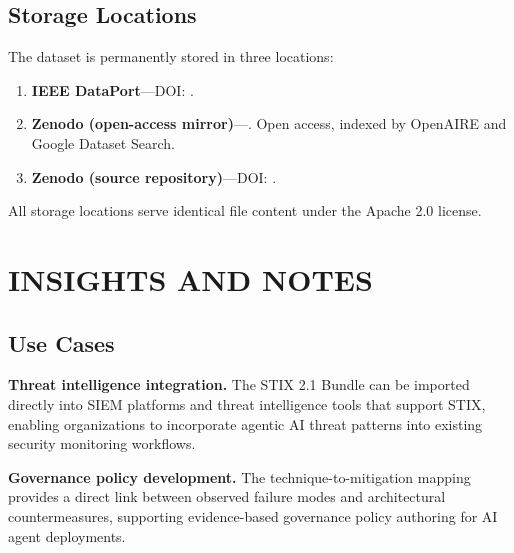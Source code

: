 \documentclass{IEEEoj-data}
\begin{document}
\subsection*{Storage Locations}

The dataset is permanently stored in three locations:

\begin{enumerate}
\item {\bf IEEE DataPort}---DOI: .
\item {\bf Zenodo (open-access mirror)}---. Open access, indexed by OpenAIRE and Google Dataset Search.
\item {\bf Zenodo (source repository)}---DOI: .
\end{enumerate}

All storage locations serve identical file content under the Apache 2.0 license.


\section*{INSIGHTS AND NOTES}

\subsection*{Use Cases}

{\bf Threat intelligence integration.} The STIX 2.1 Bundle can be imported directly into SIEM platforms and threat intelligence tools that support STIX, enabling organizations to incorporate agentic AI threat patterns into existing security monitoring workflows.

{\bf Governance policy development.} The technique-to-mitigation mapping provides a direct link between observed failure modes and architectural countermeasures, supporting evidence-based governance policy authoring for AI agent deployments.
\end{document}
